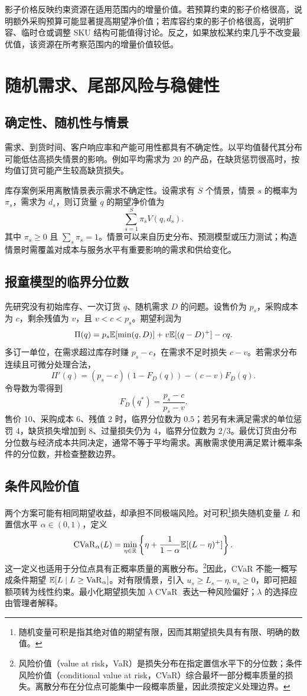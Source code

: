影子价格反映约束资源在适用范围内的增量价值。若预算约束的影子价格很高，说明额外采购预算可能显著提高期望净价值；若库容约束的影子价格很高，说明扩容、临时仓或调整 SKU 结构可能值得讨论。反之，如果放松某约束几乎不改变最优值，该资源在所考察范围内的增量价值较低。

\section{随机需求、尾部风险与稳健性}
\subsection{确定性、随机性与情景}

需求、到货时间、客户响应率和产能可用性都具有不确定性。以平均值替代其分布可能低估高损失情景的影响。例如平均需求为 20 的产品，在缺货惩罚很高时，按均值订货可能产生较高缺货损失。

库存案例采用离散情景表示需求不确定性。设需求有 \(S\) 个情景，情景 \(s\) 的概率为 \(\pi_s\)，需求为 \(d_s\)，则订货量 \(q\) 的期望净价值为
\[
  \sum_{s=1}^{S}\pi_s V(q,d_s).
\]
其中 \(\pi_s\ge0\) 且 \(\sum_s\pi_s=1\)。情景可以来自历史分布、预测模型或压力测试；构造情景时需覆盖对成本与服务水平有重要影响的需求和供给变化。

\subsection{报童模型的临界分位数}
先研究没有初始库存、一次订货 \(q\)、随机需求 \(D\) 的问题。设售价为 \(p_s\)，采购成本为 \(c\)，剩余残值为 \(v\)，且 \(v<c<p_s\)。期望利润为
\[
\Pi(q)=p_s\mathbb E[\min(q,D)]+v\mathbb E[(q-D)^+]-cq.
\]
多订一单位，在需求超过库存时赚 \(p_s-c\)，在需求不足时损失 \(c-v\)。若需求分布连续且可微分处理合法，
\[
\Pi'(q)=(p_s-c)(1-F_D(q))-(c-v)F_D(q).
\]
令导数为零得到
\[
F_D(q^*)=\frac{p_s-c}{p_s-v}.
\]
售价 10、采购成本 6、残值 2 时，临界分位数为 \(0.5\)；若另有未满足需求的单位惩罚 4，缺货损失增加到 8、过量损失仍为 4，临界分位数为 \(2/3\)。最优订货由分布分位数与经济成本共同决定，通常不等于平均需求。离散需求使用满足累计概率条件的分位数，并检查整数边界。

\subsection{条件风险价值}
两个方案可能有相同期望收益，却承担不同极端风险。对可积\footnote{随机变量可积是指其绝对值的期望有限，因而其期望损失具有有限、明确的数值。}损失随机变量 \(L\) 和置信水平 \(\alpha\in(0,1)\)，定义
\[
\operatorname{CVaR}_\alpha(L)
=\min_{\eta\in\mathbb R}
\left\{\eta+\frac1{1-\alpha}\mathbb E[(L-\eta)^+]\right\}.
\]
这一定义也适用于分位点具有正概率质量的离散分布。\footnote{风险价值（value at risk，VaR）是损失分布在指定置信水平下的分位数；条件风险价值（conditional value at risk，CVaR）综合最坏一部分概率质量的损失。离散分布在分位点可能集中一段概率质量，因此须按定义处理边界。}因此，CVaR 不能一概写成条件期望 \(\mathbb E[L\mid L\ge\operatorname{VaR}_\alpha]\)。对有限情景，引入 \(u_s\ge L_s-\eta,u_s\ge0\)，即可把超额项转为线性约束\cite{cvar09}。最小化期望损失加 \(\lambda\operatorname{CVaR}\) 表达一种风险偏好；\(\lambda\) 的选择应由管理者解释。

